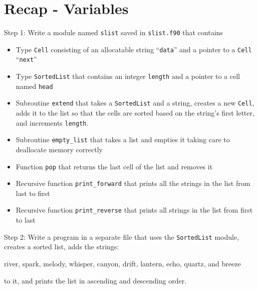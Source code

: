 
\subtitle{Nonscored exercise: linked lists}



\begin{frame}
  \titlepage
\end{frame}

\section{Recap - Variables}

\begin{frame}

Step 1: Write a module named \texttt{slist} saved in \texttt{slist.f90} that contains
\small
\begin{itemize}
    \item Type \texttt{Cell} consisting of an allocatable string ``\texttt{data}'' and a pointer to a \texttt{Cell} ``\texttt{next}''
    \item Type \texttt{SortedList} that contains an integer \texttt{length} and a pointer to a cell named \texttt{head}
    \item Subroutine \texttt{extend} that takes a \texttt{SortedList} and a string, creates a new \texttt{Cell}, adds it to the list so that the cells are sorted based on the string's first letter, and increments \texttt{length}.
    \item Subroutine \texttt{empty\_list} that takes a list and empties it taking care to deallocate memory correctly
    \item Function \texttt{pop} that returns the last cell of the list and removes it
    \item Recursive function \texttt{print\_forward} that prints all the strings in the list from last to first
    \item Recursive function \texttt{print\_reverse} that prints all strings in the list from first to last
\end{itemize}
\end{frame}

\begin{frame}

Step 2: Write a program in a separate file that uses the \texttt{SortedList} module, creates a sorted list, adds the strings:

\vspace{2mm}
river, spark, melody, whisper, canyon, drift, lantern, echo, quartz, and breeze

\vspace{2mm}
to it, and prints the list in ascending and descending order.


\end{frame}



